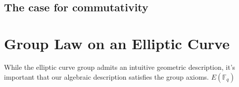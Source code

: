 \documentclass[11pt,a4paper]{article}
\newcommand{\field}{\mathbb{F}}
\begin{document}
\subsection*{The case for commutativity}


\section{Group Law on an Elliptic Curve}
While the elliptic curve group admits an intuitive geometric description, it's important that our algebraic description satisfies the group axioms.  $ E(\field_{q} )$ 
\autocite[10]{koblitz}

\newpage 

\printbibliography
\end{document}
